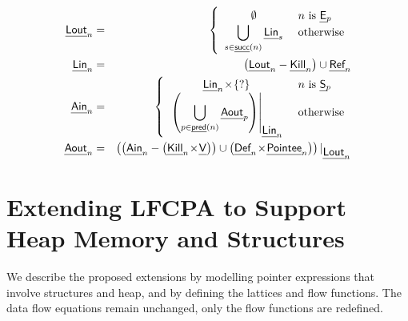 \documentclass[a4paper,11pt,fleqn]{article}
\newcommand{\End}[1]{\text{{\sf\em E}$_{#1}$}\xspace}
\newcommand{\Start}[1]{\text{{\sf\em S}$_{#1}$}\xspace}
\newcommand{\pred}{\text {\sf\em{pred}\/}}
\newcommand{\Succ}{\text{\sf\em {succ}\/}}
\newcommand{\var}{\text{\sf\em V\/}\xspace}
\newcommand{\lin}{\text{{\sf\em Lin\/}}\xspace}
\newcommand{\ain}{\text{{\sf\em Ain\/}}\xspace}
\newcommand{\lout}{\text{{\sf\em Lout\/}}\xspace}
\newcommand{\aout}{\text{{\sf\em Aout\/}}\xspace}
\newcommand{\Def}{\text{{\sf\em Def}}\xspace}
\newcommand{\Pointee}{\text{{\sf\em Pointee}}\xspace}
\newcommand{\Kill}{\text{{\sf\em Kill}}\xspace}
\newcommand{\Ref}{\text{{\sf\em Ref}}\xspace}
\newcommand{\lrestrict}[2]{\text{$\protect#1{\mid}_{\protect#2}$}}
\begin{document}
\begin{eqnarray}
\lout_n & = & 
	\left\{
		\begin{array}{c@{\ \ \ \ }l}
			\emptyset 	& n \text{ is } \End{p}
				\\
			\displaystyle\bigcup_{s \in \Succ(n)} \lin_s
				& \text{otherwise}
		\end{array}
	\right.
	\label{eq:lout.exhaustive}
	\\
\lin_n & = & 
                \left(\lout_n - \Kill_n\right) \cup \Ref_n 
	\label{eq:lin.exhaustive}
	\\
\ain_n & = & 
	\left\{ \renewcommand{\arraystretch}{1.2}
		\begin{array}{c@{\ \ \ \ }l}
			\lin_n \!\times\! \{?\}
                                & n \text{ is } \Start{p}
				\\
		\left.
		\left(\displaystyle\bigcup_{p \in \pred(n)} \aout_p\right)
		\right|_{\mbox{$\lin_n$}}
& \text{otherwise}
		\end{array}
	\right.
	\label{eq:ain.exhaustive}
	\\
\aout_n & = & 
\lrestrict{
                \left(\left(\ain_n  -  \left(\Kill_n \!\times\! \var\right)\right) \cup 
			\left( \Def_n \!\times\! \Pointee_n\right)\right)
}{\mbox{$\lout_n$}}
\label{eq:aout.exhaustive}
\end{eqnarray} 


\section{Extending LFCPA to Support Heap Memory and Structures}
\label{sec:lfcpa.heap}

\newcommand{\heap}{\text{\sf\em H\/}\xspace}
\newcommand{\fields}{\text{\sf\em F\/}\xspace}
\newcommand{\pfield}{\text{\sf\em pF\/}\xspace}
\newcommand{\npfield}{\text{\sf\em npF\/}\xspace}
\newcommand{\lRef}{\text{{\sf\em Lref}}\xspace} 
\newcommand{\rRef}{\text{{\sf\em Rref}}\xspace}
\newcommand{\hloc}{\text{{\sf\em heap}}\xspace} 
\newcommand{\allocsite}{\text{{\sf\em get\_heap\_loc}}\xspace} 
\newcommand{\lval}{\text{\sf\em lval\/}\xspace} 
\newcommand{\rval}{\text{\sf\em rval\/}\xspace} 
\newcommand{\addr}{\text{{\sf\em addr}}\xspace} 
\newcommand{\refp}{\text{\sf\em ref\/}\xspace} 
\newcommand{\derefp}{\text{\sf\em deref\/}\xspace} 
\newcommand{\lhs}{\text{\sf\em lhs\/}\xspace} 
\newcommand{\rhs}{\text{\sf\em rhs\/}\xspace} 
\newcommand{\closure}{\text{\sf\em closure\/}\xspace} 

We describe the proposed extensions by modelling pointer expressions
that involve structures and heap, and by defining the lattices and flow
functions. The data flow equations remain unchanged, only the flow
functions are redefined. 
\end{document}
